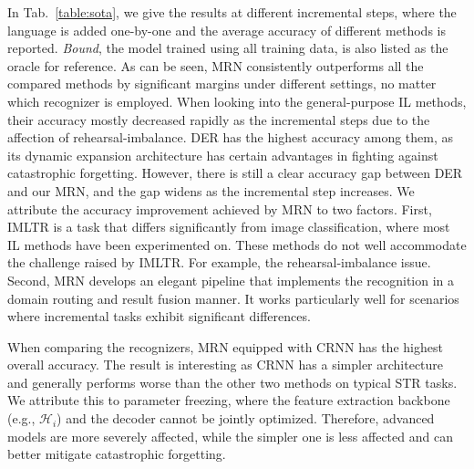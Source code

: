 \documentclass[10pt,twocolumn,letterpaper]{article}
\begin{document}
In Tab.~\ref{table:sota}, we give the results at different incremental steps, where the language is added one-by-one and the average accuracy of different methods is reported. \emph{Bound}, the model trained using all training data, is also listed as the oracle for reference. As can be seen, MRN consistently outperforms all the compared methods by significant margins under different settings, no matter which recognizer is employed. When looking into the general-purpose IL methods, their accuracy mostly decreased rapidly as the incremental steps due to the affection of rehearsal-imbalance. DER has the highest accuracy among them, as its dynamic expansion architecture has certain advantages in fighting against catastrophic forgetting. However, there is still a clear accuracy gap between DER and our MRN, and the gap widens as the incremental step increases. We attribute the accuracy improvement achieved by MRN to two factors. First, IMLTR is a task that differs significantly from image classification, where most IL methods have been experimented on. These methods do not well accommodate the challenge raised by IMLTR. For example, the rehearsal-imbalance issue. Second, MRN develops an elegant pipeline that implements the recognition in a domain routing and result fusion manner. It works particularly well for scenarios where incremental tasks exhibit significant differences. 


When comparing the recognizers, MRN equipped with CRNN has the highest overall accuracy. The result is interesting as CRNN has a simpler architecture and generally performs worse than the other two methods on typical STR tasks. We attribute this to parameter freezing, where the feature extraction backbone (e.g., $\mathcal{H}_{i}$) and the decoder cannot be jointly optimized. Therefore, advanced models are more severely affected, while the simpler one is less affected and can better mitigate catastrophic forgetting.
\end{document}

